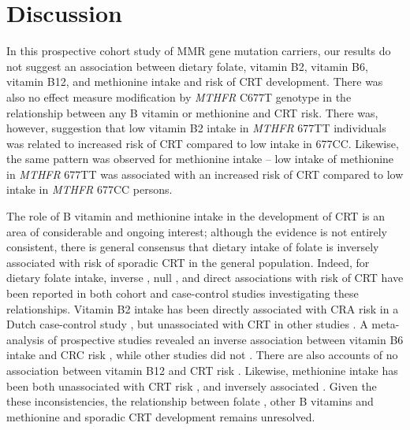 \section{Discussion} %
In this prospective cohort study of MMR gene mutation carriers, our results do not suggest an association between dietary folate, vitamin B2, vitamin B6, vitamin B12, and methionine intake and risk of CRT development. There was also no effect measure modification by \emph{MTHFR} C677T genotype in the relationship between any B vitamin or methionine and CRT risk. There was, however, suggestion that low vitamin B2 intake in \emph{MTHFR} 677TT individuals was related to increased risk of CRT compared to low intake in 677CC. Likewise, the same pattern was observed for methionine intake -- low intake of methionine in \emph{MTHFR} 677TT was associated with an increased risk of CRT compared to low intake in \emph{MTHFR} 677CC persons.

\noindent The role of B vitamin and methionine intake in the development of CRT is an area of considerable and ongoing interest; although the evidence is not entirely consistent, there is general consensus that dietary intake of folate is inversely associated with risk of sporadic CRT in the general population. Indeed, for dietary folate intake, inverse \cite{c616,c617,c634}, null \cite{c619,c622,c635,c636}, and direct \cite{c621} associations with risk of CRT have been reported in both cohort \cite{c617,c622,c634,c635} and case-control studies \cite{c616,c619,c621,c636} investigating these relationships. Vitamin B2 intake has been directly associated with CRA risk in a Dutch case-control study \cite{c621}, but unassociated with CRT in other studies \cite{c619,c620,c622,c635}. A meta-analysis of prospective studies revealed an inverse association between vitamin B6 intake and CRC risk \cite{c637}, while other studies did not \cite{c619,c620,c622,c638}. There are also accounts of no association between 
vitamin B12 and CRT risk \cite{c619,c620}. Likewise, methionine intake has been both unassociated with CRT risk \cite{c620,c635}, and inversely associated \cite{c622}. Given the these inconsistencies, the relationship between folate \cite{c639}, other B vitamins and methionine and sporadic CRT development remains unresolved.

